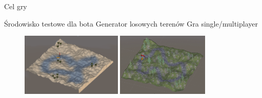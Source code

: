 \begin{frame}{Cel gry}

	\begin{itemize}
		\myitem Środowisko testowe dla bota
		\myitem Generator losowych terenów
		\myitem Gra single/multiplayer
	\end{itemize}

	\begin{figure}[!htb]
			\centering
			\includegraphics[height=3cm]{figures/terrains_2.png}
		\endminipage\hfill
			\centering
			\includegraphics[height=3cm]{figures/terrains_1.png}
		\endminipage
		\end{figure}

\end{frame}
